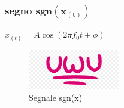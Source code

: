         \subsubsection{segno $\mathbf{sgn(x_{(t)})}$}
        $x_{(t)} = A \cos(2 \pi f_0 t +\phi)$
        \begin{figure}[H]
            \centering
            \includegraphics[width=4cm]{media/uwu.png}
            \caption{Segnale sgn(x)}
            \label{fig:segnale sgn(x)}
        \end{figure}